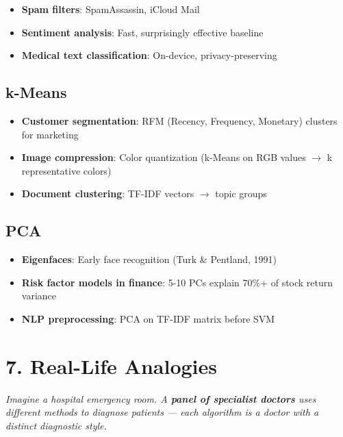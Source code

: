 \documentclass[11pt]{article}
\providecommand{\tightlist}{\setlength{\itemsep}{1pt}\setlength{\parskip}{0pt}}
\begin{document}
\begin{itemize}
\tightlist
\item
  \textbf{Spam filters}: SpamAssassin, iCloud Mail
\item
  \textbf{Sentiment analysis}: Fast, surprisingly effective baseline
\item
  \textbf{Medical text classification}: On-device, privacy-preserving
\end{itemize}

\subsection{k-Means}\label{k-means}

\begin{itemize}
\tightlist
\item
  \textbf{Customer segmentation}: RFM (Recency, Frequency, Monetary) clusters for marketing
\item
  \textbf{Image compression}: Color quantization (k-Means on RGB values \(\rightarrow\) k representative colors)
\item
  \textbf{Document clustering}: TF-IDF vectors \(\rightarrow\) topic groups
\end{itemize}

\subsection{PCA}\label{pca}

\begin{itemize}
\tightlist
\item
  \textbf{Eigenfaces}: Early face recognition (Turk \& Pentland, 1991)
\item
  \textbf{Risk factor models in finance}: 5-10 PCs explain 70\%+ of stock return variance
\item
  \textbf{NLP preprocessing}: PCA on TF-IDF matrix before SVM
\end{itemize}

\section{7. Real-Life Analogies}\label{7-real-life-analogies}

\emph{Imagine a hospital emergency room. A \textbf{panel of specialist doctors} uses different methods to diagnose patients --- each algorithm is a doctor with a distinct diagnostic style.}
\end{document}

